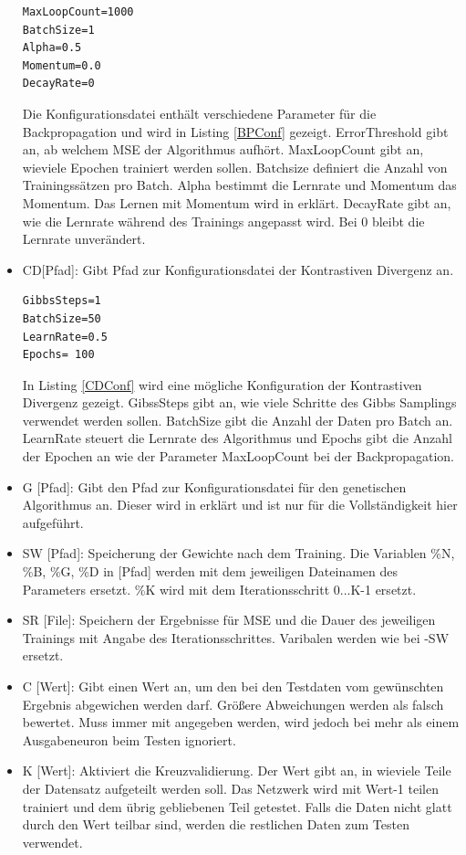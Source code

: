 \documentclass[12pt]{article}
\begin{document}
\begin{itemize}
\begin{lstlisting}[captionpos=b,caption={Beispielkonfiguration für den Backpropagation-Algorithmus},label={BPConf}]
MaxLoopCount=1000
BatchSize=1
Alpha=0.5
Momentum=0.0
DecayRate=0
\end{lstlisting}
Die Konfigurationsdatei enthält verschiedene Parameter für die Backpropagation und wird in Listing \ref{BPConf} gezeigt. ErrorThreshold gibt an, ab welchem MSE der Algorithmus aufhört. MaxLoopCount gibt an, wieviele Epochen trainiert werden sollen. Batchsize definiert die Anzahl von Trainingssätzen pro Batch. Alpha bestimmt die Lernrate und Momentum das Momentum. Das Lernen mit Momentum wird in \cite{Helm} erklärt. DecayRate gibt an, wie die Lernrate während des Trainings angepasst wird. Bei 0 bleibt die Lernrate unverändert.

\item CD[Pfad]: Gibt Pfad zur Konfigurationsdatei der Kontrastiven Divergenz an. 
\begin{lstlisting}[captionpos=b,caption={Beispielkonfiguration der Kontrastiven Divergenz},label={CDConf}]
GibbsSteps=1
BatchSize=50
LearnRate=0.5
Epochs= 100
\end{lstlisting}
In Listing \ref{CDConf} wird eine mögliche Konfiguration der Kontrastiven Divergenz gezeigt. GibssSteps gibt an, wie viele Schritte des Gibbs Samplings verwendet werden sollen. BatchSize gibt die Anzahl der Daten pro Batch an. LearnRate steuert die Lernrate des Algorithmus und Epochs gibt die Anzahl der Epochen an wie der Parameter MaxLoopCount bei der Backpropagation.

\item G [Pfad]: Gibt den Pfad zur Konfigurationsdatei für den genetischen Algorithmus an. Dieser wird in \cite{Helm} erklärt und ist nur für die Vollständigkeit hier aufgeführt.
\item SW [Pfad]:	Speicherung der Gewichte nach dem Training. Die
			Variablen \%N, \%B, \%G,  \%D in [Pfad] werden mit dem 
 			jeweiligen Dateinamen des Parameters ersetzt.
			\%K wird mit dem Iterationsschritt 0...K-1 ersetzt.
\item SR [File]:	Speichern der Ergebnisse für MSE und die Dauer des jeweiligen Trainings mit Angabe des Iterationsschrittes. Varibalen werden wie bei -SW ersetzt. 

\item C [Wert]: Gibt einen Wert an, um den bei den Testdaten vom gewünschten Ergebnis abgewichen werden darf. Größere Abweichungen werden als falsch bewertet. Muss immer mit angegeben werden, wird jedoch bei mehr als einem Ausgabeneuron beim Testen ignoriert.

\item K [Wert]: Aktiviert die Kreuzvalidierung. Der Wert gibt an, in wieviele Teile der Datensatz aufgeteilt werden soll. Das Netzwerk wird mit Wert-1 teilen trainiert und dem übrig gebliebenen Teil getestet. Falls die Daten nicht glatt durch den Wert teilbar sind, werden die restlichen Daten zum Testen verwendet. 


\end{itemize}
\end{document}
